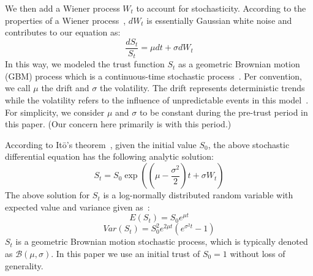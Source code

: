 We then add a Wiener process $W_t$ to account for stochasticity.
According to the properties of a Wiener process~\cite{oksendal2003stochastic},
$dW_t$ is essentially Gaussian white noise and contributes to our
equation as:
\begin{equation}\frac{d S_t}{S_t} = \mu {dt}+\sigma dW_t\end{equation}
In this way, we modeled the trust function $S_t$ as a geometric Brownian motion (GBM) process which is a continuous-time stochastic process~\cite{oksendal2003stochastic}. Per convention, we call $\mu$ the drift and $\sigma$ the volatility. The drift represents deterministic trends while the volatility refers to the influence of unpredictable events in this model~\cite{wiersema2008brownian}. For simplicity, we consider $\mu$ and $\sigma$ to be constant during the pre-trust period in this paper. (Our concern here primarily is with this period.)


According to It\={o}'s theorem~\cite{oksendal2003stochastic}, given the initial value $S_0$,
the above stochastic differential equation has the following analytic solution:
\begin{equation}
S_{t}=S_{0}\exp \left(\left(\mu -{\frac  {\sigma ^{2}}{2}}\right)t+\sigma W_{t}\right)
\end{equation}
The above solution for $S_{t}$ is a log-normally distributed random variable with expected value and variance given as~\cite{oksendal2003stochastic}:
\begin{equation}
{  {E}}(S_{t})=S_0e^{{\mu t}}
\end{equation}
\vspace{-1em}
\begin{equation}
 {Var}(S_{t})=S_0^2e^{{2\mu t}}\left(e^{{\sigma ^{2}t}}-1\right)
\end{equation} $S_t$ is a geometric Brownian motion stochastic process, which is typically denoted as $\mathcal{B}(\mu,\sigma)$.
In this paper we use an initial trust of $S_0 = 1$ without loss of generality.



